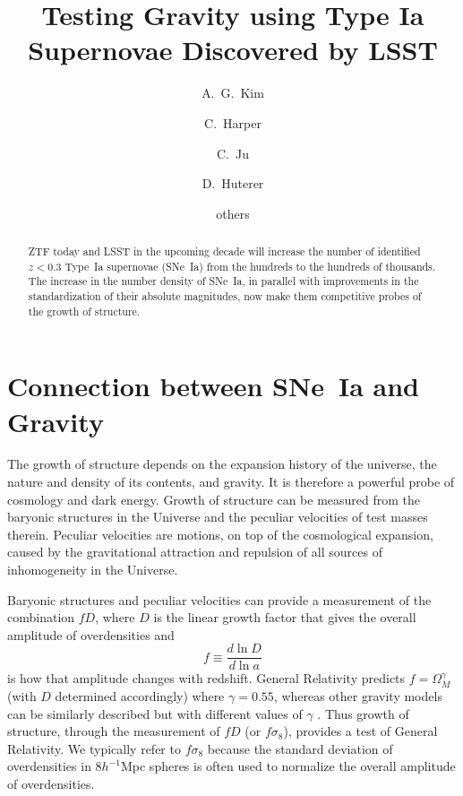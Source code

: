 \documentclass{aastex62}   	%
\begin{document}
\title{Testing Gravity using Type Ia Supernovae Discovered by LSST}
\author[0000-0001-6315-8743]{A.~G.~Kim}
\author{C.~Harper}
\author{C.~Ju}
\author{D.~Huterer}

\author{others}


\begin{abstract}
ZTF today and LSST in the upcoming decade will increase the number of identified  $z<0.3$ Type~Ia supernovae (SNe~Ia)  from the hundreds to the
hundreds of thousands.  The increase in the number density of SNe~Ia, in parallel with improvements in the standardization of
their absolute magnitudes, now make them competitive probes of the growth of structure.
\end{abstract}

\section{Connection between SNe~Ia and Gravity}


The growth of structure depends on the expansion history of the universe, the nature and density of its contents, and gravity. 
It is therefore a powerful probe of cosmology and dark energy.  Growth of structure can be measured from the baryonic structures
in the Universe and the peculiar velocities of test masses therein.
Peculiar velocities are motions, on top of the cosmological expansion, caused by the gravitational attraction
and repulsion of all sources of inhomogeneity in the Universe.

Baryonic structures and peculiar velocities  can provide a measurement of the combination $fD$, where $D$ is the linear growth factor that
gives the overall amplitude of  overdensities and
$$f \equiv \frac{d\ln{D}}{d\ln{a}}$$ is how that amplitude changes with redshift.  General Relativity predicts
$f=\Omega_M^\gamma$ (with $D$ determined accordingly) where $\gamma=0.55$, whereas other gravity models can be similarly described
but with different values of $\gamma$
\citep{2007APh....28..481L}.  Thus growth of structure, through the measurement of $fD$ (or $f\sigma_8$), provides a test of General Relativity.
We typically refer to $f\sigma_8$ because the  standard deviation of overdensities in 8$h^{-1}$Mpc spheres is often used to normalize the
overall amplitude of  overdensities.
\end{document}
